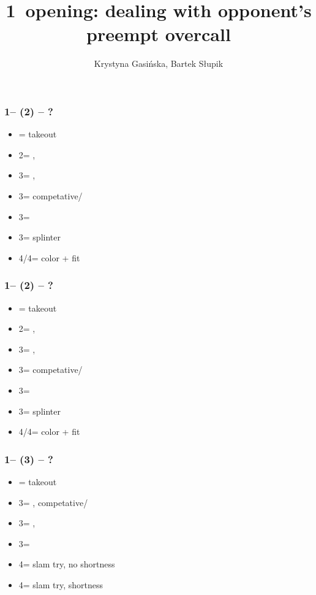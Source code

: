 \documentclass[12pt, a4paper]{article}
\title{1\hearts\ opening: dealing with opponent's preempt overcall}
\author{Krystyna Gasińska, Bartek Słupik}
\begin{document}
\maketitle


\subsubsection*{1\hearts -- (2\spades) -- ?}
\begin{itemize}
    \item \dbl = takeout
    \item 2\nt = \clubs, \invp
    \item 3\clubs = \diams, \invp
    \item 3\diams = \hearts competative/\gf
    \item 3\hearts = \hearts\ \inv
    \item 3\spades = splinter
    \item 4\clubs/4\diams = color + fit
\end{itemize}

\subsubsection*{1\hearts -- (2\spades) -- ?}
\begin{itemize}
    \item \dbl = takeout
    \item 2\nt = \clubs, \invp
    \item 3\clubs = \diams, \invp
    \item 3\diams = \hearts competative/\gf
    \item 3\hearts = \hearts\ \inv
    \item 3\spades = splinter
    \item 4\clubs/4\diams = color + fit
\end{itemize}

\subsubsection*{1\hearts -- (3\clubs) -- ?}
\begin{itemize}
    \item \dbl = takeout
    \item 3\diams = \hearts, competative/\gf
    \item 3\hearts = \hearts, \inv
    \item 3\spades = \spades\ \gf
    \item 4\clubs = slam try, no \clubs shortness
    \item 4\diams = slam try, \clubs shortness
\end{itemize}
\end{document}
